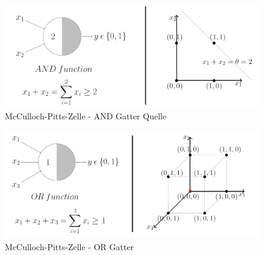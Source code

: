 \begin{figure}[!htb]
	\centering
	\includegraphics[width=\linewidth]{img/mpn_and}
	\caption[McCulloch-Pitts-Zelle - AND Gatter]{McCulloch-Pitts-Zelle - AND Gatter \small{Quelle \cite{mpNeuron}}}
	\label{fig:mpn_and}
\end{figure}

\begin{figure}[!htb]
	\centering
	\includegraphics[width=\linewidth]{img/mpn_or}
	\caption{McCulloch-Pitts-Zelle - OR Gatter \cite{mpNeuron}}
	\label{fig:mpn_or}
\end{figure}


